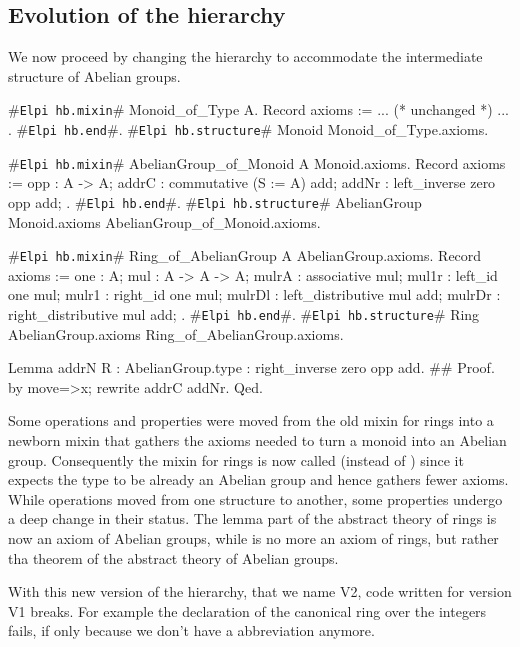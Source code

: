 \documentclass[a4paper,UKenglish,cleveref, autoref]{lipics-v2019}
\newcommand{\mixin}{mixin}
\newcommand{\phantterm}{abbreviation}
\newcommand{\hbmixin}{{\tt\color{dkgreen}Elpi hb.mixin}}
\newcommand{\hbstructure}{{\tt\color{dkgreen}Elpi hb.structure}}
\newcommand{\hbend}{{\tt\color{dkgreen}Elpi hb.end}}
\theoremstyle{implem}
\theoremstyle{implem}
\theoremstyle{command}
\begin{document}
\subsection{Evolution of the hierarchy}\label{subsec:evolution}

We now proceed by changing the hierarchy to accommodate the intermediate
structure of Abelian groups.

\begin{coqcode}
#\hbmixin{}# Monoid_of_Type A.
  Record axioms := { ... (* unchanged *) ... }.
#\hbend{}#.
#\hbstructure{}# Monoid Monoid_of_Type.axioms.

#\hbmixin{}# AbelianGroup_of_Monoid A Monoid.axioms.
  Record axioms := {
    opp : A -> A;
    addrC : commutative (S := A) add;
    addNr : left_inverse zero opp add;
  }.
#\hbend{}#.
#\hbstructure{}# AbelianGroup Monoid.axioms AbelianGroup_of_Monoid.axioms.

#\hbmixin{}# Ring_of_AbelianGroup A AbelianGroup.axioms.
  Record axioms := {
    one : A;
    mul : A -> A -> A;
    mulrA : associative mul;
    mul1r : left_id one mul;
    mulr1 : right_id one mul;
    mulrDl : left_distributive mul add;
    mulrDr : right_distributive mul add;
  }.
#\hbend{}#.
#\hbstructure{}# Ring AbelianGroup.axioms Ring_of_AbelianGroup.axioms.

Lemma addrN {R : AbelianGroup.type} : right_inverse zero opp add.               #\label{demo2:proof:addrN}#
Proof. by move=>x; rewrite addrC addNr. Qed.
\end{coqcode}

Some operations and properties were moved from the old \mixin{} for rings
into a newborn \mixin{}  that gathers the
axioms needed to turn a monoid into an Abelian group. Consequently the \mixin{}
for rings is now called  (instead of )
since it expects the type  to be already an Abelian group and hence
gathers fewer axioms. \\
While operations moved from one structure to another, some properties
undergo a deep change in their status.
The lemma  part of the abstract theory of
rings is now an axiom of Abelian groups, while  is no more
an axiom of rings, but rather tha theorem of the abstract theory of Abelian
groups.

With this new version of the hierarchy, that we name V2, code written
for version V1 breaks. For example the declaration of the canonical ring over
the integers fails, if only
because we don't have a  \phantterm{} anymore.
\end{document}
